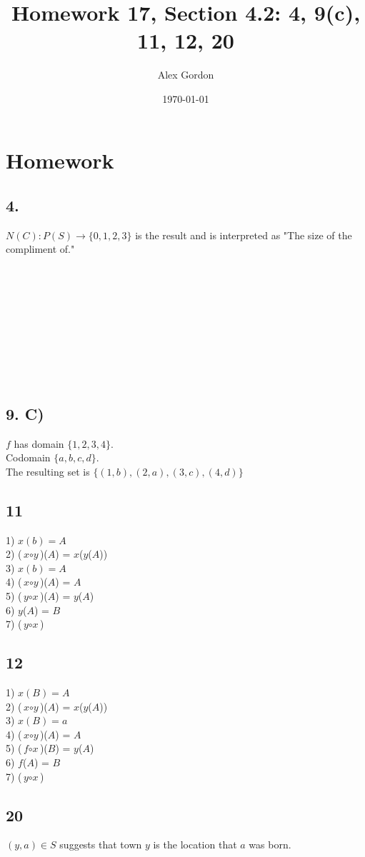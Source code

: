 \documentclass[12]{scrartcl}
\begin{document}
\title{Homework 17, Section 4.2: 4, 9(c), 11, 12, 20}
\author{Alex Gordon}
\date{\today}
\maketitle
\section*{Homework}
\subsection*{4.}
$N(C) : P(S) \rightarrow \{0, 1, 2, 3\}$ is the result and is interpreted as "The size of the compliment of."
\
\\
\\
\\
\\
\\
\\
\\
\\
\\
\\
\subsection*{9. C)}
$f$ has domain $\{1, 2, 3, 4\}$.\\
Codomain $\{a, b, c, d\}$.\\
The resulting set is $\{(1,b), (2,a), (3,c), (4,d)\}$
\subsection*{11}
1) $\textit{x}(\textit{b}) = \textit{A}$\\
2) ($\textit{x}\circ\textit{y}$)($\textit{A}$) = $\textit{x}$($\textit{y}$($\textit{A}$))\\
3) $\textit{x}(\textit{b}) = \textit{A}$\\
4) ($\textit{x}\circ\textit{y}$)($\textit{A}$) = $\textit{A}$\\
5) ($\textit{y}\circ\textit{x}$)($\textit{A}$) = $\textit{y}$($\textit{A}$)\\
6) $\textit{y}$($\textit{A}$) = $\textit{B}$\\
7) ($\textit{y}\circ\textit{x}$)
\subsection*{12}
1) $\textit{x}(\textit{B}) = \textit{A}$\\
2) ($\textit{x}\circ\textit{y}$)($\textit{A}$) = $\textit{x}$($\textit{y}$($\textit{A}$))\\
3) $\textit{x}(\textit{B}) = \textit{a}$\\
4) ($\textit{x}\circ\textit{y}$)($\textit{A}$) = $\textit{A}$\\
5) ($\textit{f}\circ\textit{x}$)($\textit{B}$) = $\textit{y}$($\textit{A}$)\\
6) $\textit{f}$($\textit{A}$) = $\textit{B}$\\
7) ($\textit{y}\circ\textit{x}$)
\subsection*{20}
$(y, a) \in S$ suggests that town $y$ is the location that $a$ was born. 
\end{document}
